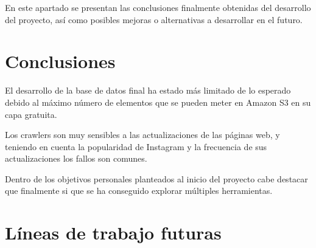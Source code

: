 

En este apartado se presentan las conclusiones finalmente obtenidas del desarrollo del proyecto, así como posibles mejoras o alternativas a desarrollar en el futuro.

\section{Conclusiones}


El desarrollo de la base de datos final ha estado más limitado de lo esperado debido al máximo número de elementos que se pueden meter en Amazon S3 en su capa gratuita.

Los crawlers son muy sensibles a las actualizaciones de las páginas web, y teniendo en cuenta la popularidad de Instagram y la frecuencia de sus actualizaciones los fallos son comunes.

Dentro de los objetivos personales planteados al inicio del proyecto cabe destacar que finalmente si que se ha conseguido explorar múltiples herramientas.

\section{Líneas de trabajo futuras}
